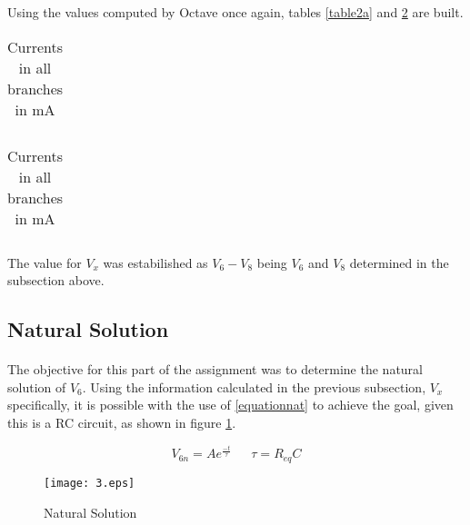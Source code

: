 Using the values computed by Octave once again, tables \ref{table2a} and \ref{table2b} are built.

\begin{table}[H]
    \begin{minipage}{.5\linewidth}
      \centering
        \begin{tabular}{|c|c|}
    	\hline
        	
        \end{tabular}
        \caption{Voltages in all nodes in V}
        \label{table2a}
    \end{minipage}%
    \begin{minipage}{.5\linewidth}
      \centering
        \begin{tabular}{|c|c|}
   	\hline
        	
        \end{tabular}
        \caption{Currents in all branches in mA}
        \label{table2b}
    \end{minipage} 
\end{table}


\par The value for $V_x$ was estabilished as $V_6 - V_8$ being $V_6$ and $V_8$ determined in the subsection above.

\subsection{Natural Solution}
\paragraph{}

\par The objective for this part of the assignment was to determine the natural solution of $V_6$. Using the information calculated in the previous subsection, $V_x$ specifically, it is possible with the use of \ref{equationnat} to achieve the goal, given this is a RC circuit, as shown in figure \ref{3}. 

\begin{equation}
	V_{6n} = A e^{\frac{-t}{\tau}}  \ \ \  \ \ \ \ \tau = R_{eq} C
	\label{equationnat}
\end{equation}



\begin{figure}[H]
    \texttt{[image: 3.eps]}
    \centering
    \caption{Natural Solution}
    \label{3}
\end{figure}

